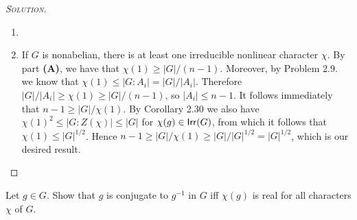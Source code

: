 \begin{proof}[{\scshape Solution}]
  \hfill
  \begin{enumerate}[font=\normalfont,label=\textbf{(\Alph*)}, wide]
    \item
    \begin{comment}

    Since all the subgroups are disjoint, we have that $\lvert G \rvert = \sum_i^n \lvert A_i \rvert - (n-1)$. By problem 2.9. we know that $\chi(1) \leq \lvert G : A_i \rvert$ for all $A_i$. If $\chi(1) > 1$, we know that at least one of the $A_i$ has $\lvert A_i \rvert > 1$. Let $A_j$ be of maximal size among the $A_i$. Then $\lvert G \rvert /(n-1) =  \sum_i^n \lvert A_i \rvert/\lvert A_i \rvert - n-1$.


    Since the subgroups $A_i$ are abelian, we know that $\chi_{A_i}(1) = 1$. Since the $A_i$ are disjoint and together make up $G$, we have that $\chi(1),  = \sum_{A_i}\chi_{A_i}(1) - n-1(\chi(1)) = n-(n-1)$. Now


    By lemma 2.29 we kn

    By the second orthogonality relation
    \[
      \lvert G \rvert = \sum_{\Irr(G)}\chi(1)\overline{\chi(1)}.
    \]
    The conjugacy classes are precisely the ingoing abelian groups in the union, so
\end{comment}
    \item If $G$ is nonabelian, there is at least one irreducible nonlinear character $\chi$. By part \textbf{(A)}, we have that $\chi(1) \geq \lvert G \rvert /(n-1)$. Moreover, by Problem 2.9. we know that $\chi(1) \leq \lvert G : A_i \rvert = \lvert G \rvert / \lvert A_i \rvert $. Therefore $\lvert G \rvert / \lvert A_i \rvert \geq \chi(1) \geq \lvert G \rvert /(n-1)$, so $\lvert A_i \rvert \leq n-1$. It follows immediately that $n-1 \geq \lvert G \rvert /\chi(1)$. By Corollary 2.30 we also have $\chi(1)^2 \leq \lvert G : Z(\chi)\rvert \leq \lvert G \rvert$ for $\chi(g) \in \mathsf{Irr}(G)$, from which it follows that $\chi(1) \leq \lvert G \rvert^{1/2}$. Hence $n-1 \geq \lvert G \rvert /\chi(1) \geq \lvert G \rvert / \lvert G \rvert^{1/2} = \lvert G \rvert^{1/2}$, which is our desired result.

  \end{enumerate}
\end{proof}

\newpage
\begin{problem}[2.11]
Let $g\in G$. Show that $g$ is conjugate to $g^{-1}$ in $G$ iff $\chi(g)$ is real for all characters $\chi$ of $G$.
\end{problem}

